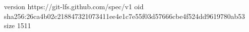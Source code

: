 version https://git-lfs.github.com/spec/v1
oid sha256:26ca4b02c218847321073411ee4e1c7e55f03d57666cbe4f524dd9619780ab53
size 1511
